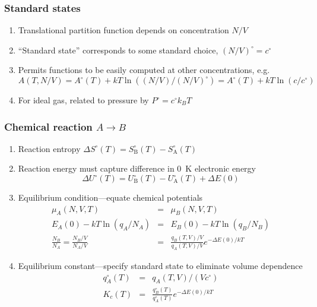 \documentclass[11pt]{article}
\begin{document}
\subsubsection{Standard states}
\label{sec:orgd4455b9}
\begin{enumerate}
\item Translational partition function depends on concentration \(N/V\)
\item ``Standard state'' corresponds to some standard choice, \((N/V)^\circ = c^\circ\)
\item Permits functions to be easily computed at other concentrations, e.g.
\begin{displaymath}
A(T,N/V)  = A^\circ(T) + k T \ln\left ( (N/V)/(N/V)^\circ \right ) =A^\circ(T) + k T \ln \left ( c/c^\circ \right )
\end{displaymath}
\item For ideal gas, related to pressure by \(P^\circ = c^\circ k_B T\)
\end{enumerate}
\subsubsection{Chemical reaction \(A \rightarrow B\)}
\label{sec:org40893e9}
\begin{enumerate}
\item Reaction entropy \(\Delta S^\circ (T) =  S^\circ_\mathrm{B}(T)-S^\circ_\mathrm{A}(T)\)
\item Reaction energy must capture difference in \SI{0}{K} electronic energy
  \begin{displaymath}
\Delta U^\circ (T) = U^\circ_\mathrm{B}(T)-U^\circ_\mathrm{A}(T)+\Delta E(0)
   \end{displaymath}
\item Equilibrium condition---equate chemical potentials
  \begin{eqnarray*}
 \mu_A(N,V,T) & = & \mu_B(N,V,T) \\
 E_A(0) - k T \ln (q_A/N_A) & = & E_B(0) - k T \ln (q_B/N_B) \\
\frac{N_B}{N_A} =  \frac{N_B/V}{N_A/V} & = &\frac{q_B(T,V)/V}{q_A(T,V)/V} e^{-\Delta E(0)/kT}
  \end{eqnarray*}
\item Equilibrium constant---specify standard state to eliminate volume dependence
 \begin{eqnarray*}
  q_A^\circ(T) & = & q_A(T,V)/(V c^\circ) \\
K_c(T) & = &\frac{q_B^\circ(T)}{q_A^\circ(T)} e^{-\Delta E(0)/kT}
 \end{eqnarray*}
\end{enumerate}
\end{document}
